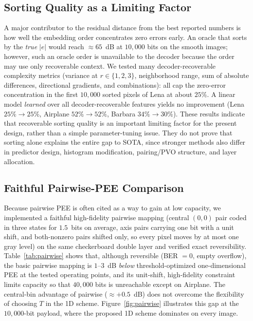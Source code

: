 \documentclass[journal,article,submit,pdftex,moreauthors]{Definitions/mdpi}
\begin{document}
\subsection{Sorting Quality as a Limiting Factor}\label{sec:sortlimit}
A major contributor to the residual distance from the best reported numbers is how well the embedding order concentrates zero errors early. An oracle that sorts by the \emph{true} $|e|$ would reach $\approx65$~dB at $10{,}000$ bits on the smooth images; however, such an oracle order is unavailable to the decoder because the order may use only recoverable context. We tested many decoder-recoverable complexity metrics (variance at $r\in\{1,2,3\}$, neighborhood range, sum of absolute differences, directional gradients, and combinations): all cap the zero-error concentration in the first $10{,}000$ sorted pixels of Lena at about $25\%$. A linear model \emph{learned} over all decoder-recoverable features yields no improvement (Lena $25\%\!\to\!25\%$, Airplane $52\%\!\to\!52\%$, Barbara $34\%\!\to\!30\%$). These results indicate that recoverable sorting quality is an important limiting factor for the present design, rather than a simple parameter-tuning issue. They do not prove that sorting alone explains the entire gap to SOTA, since stronger methods also differ in predictor design, histogram modification, pairing/PVO structure, and layer allocation.

\subsection{Faithful Pairwise-PEE Comparison}\label{sec:pairwise}
Because pairwise PEE is often cited as a way to gain at low capacity, we implemented a faithful high-fidelity pairwise mapping (central $(0,0)$ pair coded in three states for $1.5$~bits on average, axis pairs carrying one bit with a unit shift, and both-nonzero pairs shifted only, so every pixel moves by at most one gray level) on the same checkerboard double layer and verified exact reversibility. Table~\ref{tab:pairwise} shows that, although reversible (BER $=0$, empty overflow), the basic pairwise mapping is $1$--$3$~dB \emph{below} threshold-optimized one-dimensional PEE at the tested operating points, and its unit-shift, high-fidelity constraint limits capacity so that $40{,}000$ bits is unreachable except on Airplane. The central-bin advantage of pairwise ($\approx+0.5$~dB) does not overcome the flexibility of choosing $T$ in the 1D scheme. Figure~\ref{fig:pairwise} illustrates this gap at the $10{,}000$-bit payload, where the proposed 1D scheme dominates on every image.
\end{document}
